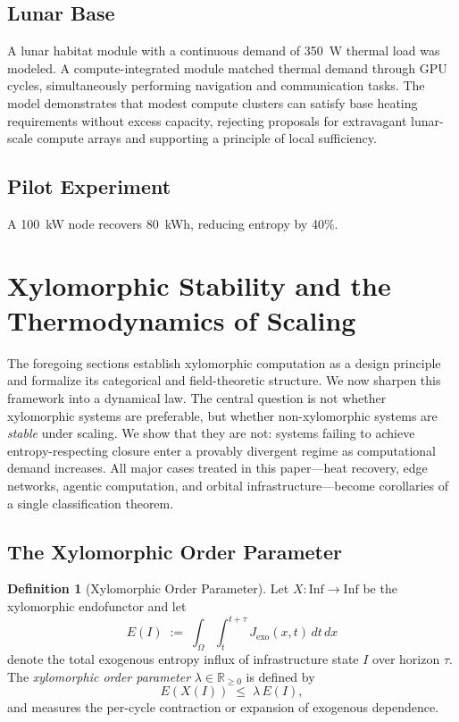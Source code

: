 \documentclass[11pt,a4paper]{article}
\theoremstyle{plain}
\theoremstyle{definition}
\newtheorem{definition}[theorem]{Definition}
\theoremstyle{remark}
\begin{document}
\subsection{Lunar Base}

A lunar habitat module with a continuous demand of 350~W thermal load was
modeled. A compute-integrated module matched thermal demand through GPU cycles,
simultaneously performing navigation and communication tasks. The model
demonstrates that modest compute clusters can satisfy base heating requirements
without excess capacity, rejecting proposals for extravagant lunar-scale
compute arrays and supporting a principle of local sufficiency.

\subsection{Pilot Experiment}

A 100~kW node recovers 80~kWh, reducing entropy by 40\%.

\section{Xylomorphic Stability and the Thermodynamics of Scaling}
\label{sec:stability}

The foregoing sections establish xylomorphic computation as a design principle
and formalize its categorical and field-theoretic structure. We now sharpen
this framework into a dynamical law. The central question is not whether
xylomorphic systems are preferable, but whether non-xylomorphic systems are
\emph{stable} under scaling. We show that they are not: systems failing to
achieve entropy-respecting closure enter a provably divergent regime as
computational demand increases. All major cases treated in this
paper---heat recovery, edge networks, agentic computation, and orbital
infrastructure---become corollaries of a single classification theorem.

\subsection{The Xylomorphic Order Parameter}

\begin{definition}[Xylomorphic Order Parameter]
Let $X : \mathrm{Inf} \to \mathrm{Inf}$ be the xylomorphic endofunctor and
let
\[
  E(I) \;:=\; \int_{\Omega}\int_{t}^{t+\tau}
  J_{\mathrm{exo}}(x,t)\,dt\,dx
\]
denote the total exogenous entropy influx of infrastructure state $I$ over
horizon $\tau$. The \emph{xylomorphic order parameter} $\lambda \in
\mathbb{R}_{\geq 0}$ is defined by
\[
  E(X(I)) \;\leq\; \lambda\,E(I),
\]
and measures the per-cycle contraction or expansion of exogenous dependence.
\end{definition}
\end{document}
